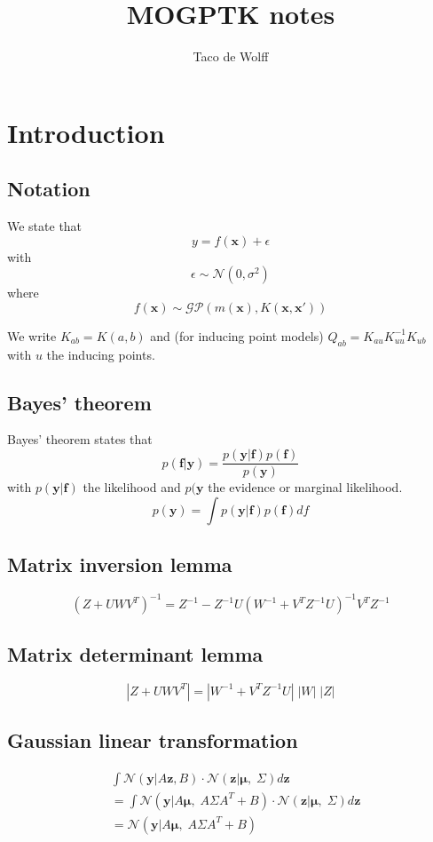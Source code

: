 \documentclass[5p,11pt]{article}
\title{MOGPTK notes}
\author{Taco de Wolff}
\begin{document}
\maketitle

\section{Introduction}
\subsection{Notation}
We state that
$$ y = f(\bm{x}) + \epsilon$$
with
$$\epsilon \sim \mathcal{N}(0,\sigma^2)$$
where
$$ f(\bm{x}) \sim \mathcal{GP}(m(\bm{x}), K(\bm{x},\bm{x}')) $$

We write $K_{ab} = K(a,b)$ and (for inducing point models) $Q_{ab} = K_{au}K_{uu}^{-1}K_{ub}$ with $u$ the inducing points.

\subsection{Bayes' theorem}
Bayes' theorem states that
$$ p(\bm{f}|\bm{y}) = \frac{p(\bm{y}|\bm{f}) p(\bm{f})}{p(\bm{y})}$$
with $p(\bm{y}|\bm{f})$ the likelihood and $p(\bm{y}$ the evidence or marginal likelihood.
\begin{equation}
\label{eq:marginal_likelihood}
p(\bm{y}) = \int p(\bm{y}|\bm{f}) p(\bm{f}) df
\end{equation}

\subsection{Matrix inversion lemma}
$$ (Z+UWV^T)^{-1} = Z^{-1} - Z^{-1}U(W^{-1} + V^TZ^{-1}U)^{-1}V^TZ^{-1} $$

\subsection{Matrix determinant lemma}
$$ |Z+UWV^T| = |W^{-1} + V^TZ^{-1}U|\;|W|\;|Z| $$

\subsection{Gaussian linear transformation}
\begin{equation}
\label{eq:gauss_linear}
    \begin{aligned}
&\int \mathcal{N}(\bm{y}|A\bm{z}, B) \cdot \mathcal{N}(\bm{z}|\bm{\mu},\; \Sigma) d\bm{z}\\
&= \int \mathcal{N}(\bm{y}|A\bm{\mu},\; A\Sigma A^T + B) \cdot \mathcal{N}(\bm{z}|\bm{\mu},\; \Sigma) d\bm{z}\\
&= \mathcal{N}(\bm{y}|A\bm{\mu},\; A\Sigma A^T + B)
    \end{aligned}
\end{equation}
\end{document}
